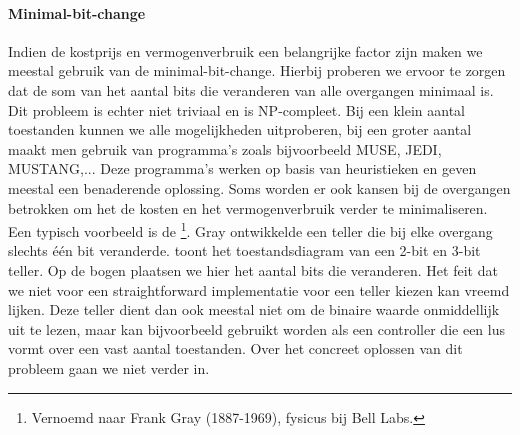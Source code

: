 \paragraph{Minimal-bit-change}Indien de kostprijs en vermogenverbruik een belangrijke factor zijn maken we meestal gebruik van de minimal-bit-change. Hierbij proberen we ervoor te zorgen dat de som van het aantal bits die veranderen van alle overgangen minimaal is. Dit probleem is echter niet triviaal en is NP-compleet. Bij een klein aantal toestanden kunnen we alle mogelijkheden uitproberen, bij een groter aantal maakt men gebruik van programma's zoals bijvoorbeeld MUSE, JEDI, MUSTANG,... Deze programma's werken op basis van heuristieken en geven meestal een benaderende oplossing. Soms worden er ook kansen bij de overgangen betrokken om het de kosten en het vermogenverbruik verder te minimaliseren. Een typisch voorbeeld is de \footnote{Vernoemd naar Frank Gray (1887-1969), fysicus bij Bell Labs.}. Gray ontwikkelde een teller die bij elke overgang slechts \'e\'en bit veranderde.  toont het toestandsdiagram van een 2-bit en 3-bit teller. Op de bogen plaatsen we hier het aantal bits die veranderen. Het feit dat we niet voor een straightforward implementatie voor een teller kiezen kan vreemd lijken. Deze teller dient dan ook meestal niet om de binaire waarde onmiddellijk uit te lezen, maar kan bijvoorbeeld gebruikt worden als een controller die een lus vormt over een vast aantal toestanden. Over het concreet oplossen van dit probleem gaan we niet verder in.

